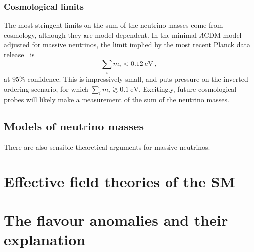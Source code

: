 \subsubsection{Cosmological limits}

The most stringent limits on the sum of the neutrino masses come from cosmology,
although they are model-dependent. In the minimal $\Lambda$CDM model adjusted
for massive neutrinos, the limit implied by the most recent Planck data
release~\cite{Aghanim:2018eyx} is
\begin{equation}
  \sum_{i} m_{i} < \SI{0.12}{\eV} \ ,
\end{equation}
at $95\%$ confidence. This is impressively small, and puts pressure on the
inverted-ordering scenario, for which $\sum_{i} m_{i} \gtrsim \SI{0.1}{\eV}$.
Excitingly, future cosmological probes will likely make a measurement of the sum
of the neutrino masses.

\subsection{Models of neutrino masses}

There are also sensible theoretical arguments for massive neutrinos.

\section{Effective field theories of the SM}

\lipsum[2]

\section{The flavour anomalies and their explanation}

\lipsum[2]

